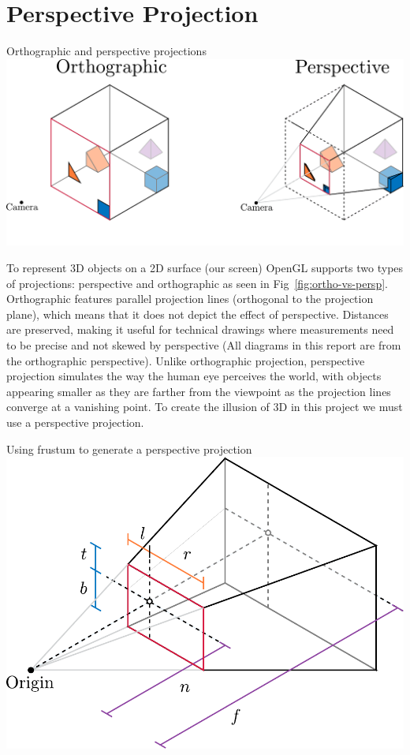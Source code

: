 \section{Perspective Projection}

\begin{figureBox}[label={fig:ortho-vs-persp}, width=0.8\linewidth]{Orthographic and perspective projections}
    \includegraphics[width = 0.8\linewidth]{./background/figures/projection/ortho-vs-persp.pdf}
\end{figureBox}

To represent 3D objects on a 2D surface (our screen) OpenGL supports two types of projections: perspective and orthographic as seen in Fig~\ref{fig:ortho-vs-persp}. Orthographic features parallel projection lines (orthogonal to the projection plane), which means that it does not depict the effect of perspective. Distances are preserved, making it useful for technical drawings where measurements need to be precise and not skewed by perspective (All diagrams in this report are from the orthographic perspective). Unlike orthographic projection, perspective projection simulates the way the human eye perceives the world, with objects appearing smaller as they are farther from the viewpoint as the projection lines converge at a vanishing point. To create the illusion of 3D in this project we must use a perspective projection. \\

\begin{figureBox}[label={fig:persp-projection}, width=0.8\linewidth]{Using frustum to generate a perspective projection}
    \includegraphics[width = 0.5\linewidth]{./background/figures/projection/persp-projection.pdf}
\end{figureBox}

